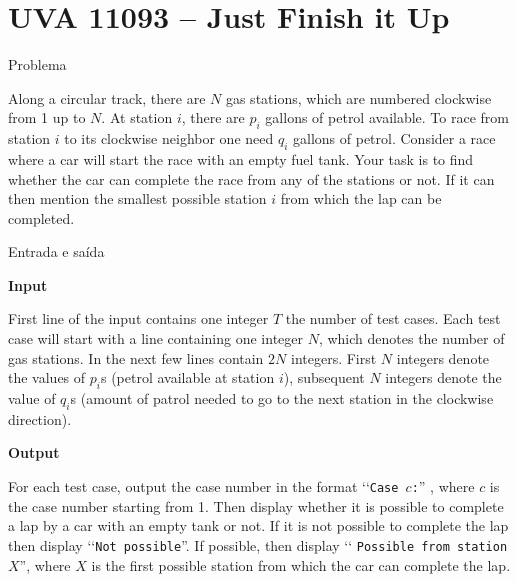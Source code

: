 \section{UVA 11093 -- Just Finish it Up}

\begin{frame}[fragile]{Problema}

Along a circular track, there are $N$ gas stations, which are numbered clockwise from 1 up to $N$. 
At station $i$, there are $p_i$ gallons of petrol available. To race from station $i$ to its 
clockwise neighbor one need $q_i$ gallons of petrol. Consider a race where a car will start the 
race with an empty fuel tank. Your task is to find whether the car can complete the race from any 
of the stations or not. If it can then mention the smallest possible station $i$ from which the 
lap can be completed.

\end{frame}
 
\begin{frame}[fragile]{Entrada e saída}

\textbf{Input}

First line of the input contains one integer $T$ the number of test cases. Each test case will 
start with a line containing one integer $N$, which denotes the number of gas stations. In the 
next few lines contain $2N$ integers. First $N$ integers denote the values of $p_i$s 
(petrol available at station $i$), subsequent $N$ integers denote the value of $q_i$s 
(amount of patrol needed to go to the next station in the clockwise direction).

\textbf{Output}

For each test case, output the case number in the format \lq\lq \texttt{Case $c$:}” , 
where $c$ is the case number starting from 1. Then display whether it is possible to complete a 
lap by a car with an empty tank or not. If it is not possible to complete the lap then display 
\lq\lq \texttt{Not possible}”. If possible, then display \lq\lq 
\texttt{Possible from station $X$}”, where $X$ is the first possible station from which the car 
can complete the lap.

\end{frame}


